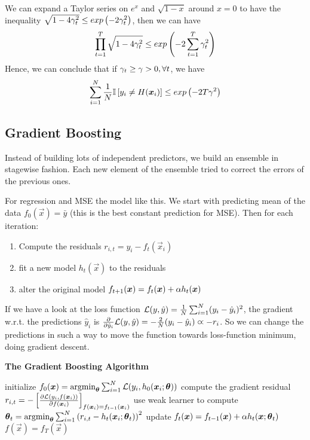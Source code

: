 We can expand a Taylor series on $e^x$ and $\sqrt{1-x}$ around $x=0$ to have the inequality $\sqrt{1-4\gamma_t^2}\leq exp\left(-2\gamma_t^2\right)$, then we can have
\begin{align*}
	\prod_{t=1}^T\sqrt{1-4\gamma_t^2}\leq exp\left(-2\sum_{t=1}^T\gamma_t^2\right)
\end{align*}
Hence, we can conclude that if $\gamma_t\geq\gamma>0,\forall t$, we have
\begin{align*}
	\sum_{i=1}^N\frac{1}{N}\mathbb{I}\left[y_i\neq H(\boldsymbol{x}_i)\right]\leq exp\left(-2T\gamma^2\right)
\end{align*}

\subsection{Gradient Boosting}

Instead of building lots of independent predictors, we build an ensemble in stagewise fashion. Each new element of the ensemble tried to correct the errors of the previous ones.

For regression and MSE the model like this. We start with predicting mean of the data $f_0(\vec{x})=\bar{y}$ (this is the best constant prediction for MSE). Then for each iteration:
\begin{enumerate}
	\item Compute the residuals $r_{i,t}=y_i-f_t(\vec{x}_i)$
	\item fit a new model $h_t(\vec{x})$ to the residuals
	\item alter the original model $f_{t+1}(\boldsymbol{x})=f_t(\boldsymbol{x})+\alpha h_t(\boldsymbol{x})$
\end{enumerate}
If we have a look at the loss function $\mathcal{L}(y,\hat{y})=\frac{1}{N}\sum_{i=1}^N(y_i-\hat{y}_i)^2$, the gradient w.r.t. the predictions $\hat{y}_i$ is $\frac{\partial}{\partial\hat{y}_i}\mathcal{L}(y,\hat{y})=-\frac{2}{N}(y_i-\hat{y}_i)\varpropto-r_i$. So we can change the predictions in such a way to move the function towards loss-function minimum, doing gradient descent.
\begin{algorithm}[H]
	\caption*{\bf The Gradient Boosting Algorithm}
	\begin{algorithmic}
		\State initialize $f_0(\vec{x})=\argmin_{\vec{\th}}\sum_{i=1}^N\cL(y_i,h_0(\vec{x}_i;\vec{\th}))$
		\State compute the gradient residual $r_{i,t}=-\left[\frac{\partial\mathcal{L}(y_i,f(\boldsymbol{x}_i))}{\partial f(\boldsymbol{x}_i)}\right]_{f(\boldsymbol{x}_i)=f_{t-1}(\boldsymbol{x}_i)}$
		\State use weak learner to compute $\vec{\th}_t=\argmin_{\vec{\th}}\sum_{i=1}^N\left(r_{i,t}-h_t(\vec{x}_i;\vec{\th}_t)\right)^2$
		\State update $f_t(\boldsymbol{x})=f_{t-1}(\boldsymbol{x})+\alpha h_t(\boldsymbol{x};\boldsymbol{\theta}_t)$
		\EndFor
		\State \Return $f(\vec{x})=f_T(\vec{x})$
	\end{algorithmic}
\end{algorithm}
